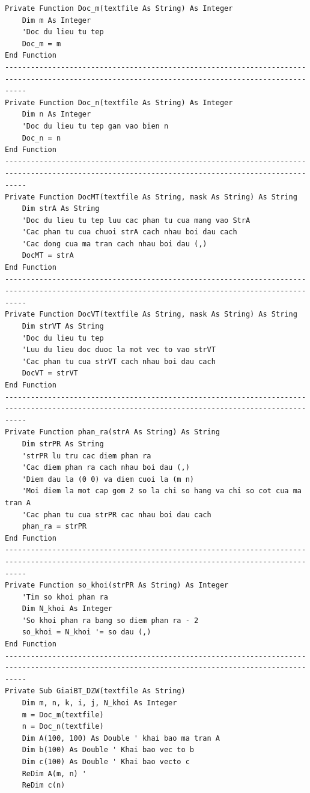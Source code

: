 {\footnotesize
\begin{verbatim}
Private Function Doc_m(textfile As String) As Integer
    Dim m As Integer
    'Doc du lieu tu tep
    Doc_m = m
End Function
-------------------------------------------------------------------------------------------------------------------------------------------------
Private Function Doc_n(textfile As String) As Integer
    Dim n As Integer
    'Doc du lieu tu tep gan vao bien n
    Doc_n = n
End Function
-------------------------------------------------------------------------------------------------------------------------------------------------
Private Function DocMT(textfile As String, mask As String) As String
    Dim strA As String
    'Doc du lieu tu tep luu cac phan tu cua mang vao StrA
    'Cac phan tu cua chuoi strA cach nhau boi dau cach
    'Cac dong cua ma tran cach nhau boi dau (,)
    DocMT = strA
End Function
-------------------------------------------------------------------------------------------------------------------------------------------------
Private Function DocVT(textfile As String, mask As String) As String
    Dim strVT As String
    'Doc du lieu tu tep
    'Luu du lieu doc duoc la mot vec to vao strVT
    'Cac phan tu cua strVT cach nhau boi dau cach
    DocVT = strVT
End Function
-------------------------------------------------------------------------------------------------------------------------------------------------
Private Function phan_ra(strA As String) As String
    Dim strPR As String
    'strPR lu tru cac diem phan ra
    'Cac diem phan ra cach nhau boi dau (,)
    'Diem dau la (0 0) va diem cuoi la (m n)
    'Moi diem la mot cap gom 2 so la chi so hang va chi so cot cua ma tran A
    'Cac phan tu cua strPR cac nhau boi dau cach
    phan_ra = strPR
End Function
-------------------------------------------------------------------------------------------------------------------------------------------------
Private Function so_khoi(strPR As String) As Integer
    'Tim so khoi phan ra
    Dim N_khoi As Integer
    'So khoi phan ra bang so diem phan ra - 2
    so_khoi = N_khoi '= so dau (,)
End Function
-------------------------------------------------------------------------------------------------------------------------------------------------
Private Sub GiaiBT_DZW(textfile As String)
    Dim m, n, k, i, j, N_khoi As Integer
    m = Doc_m(textfile)
    n = Doc_n(textfile)
    Dim A(100, 100) As Double ' khai bao ma tran A
    Dim b(100) As Double ' Khai bao vec to b
    Dim c(100) As Double ' Khai bao vecto c
    ReDim A(m, n) '
    ReDim c(n)

\end{verbatim}}
